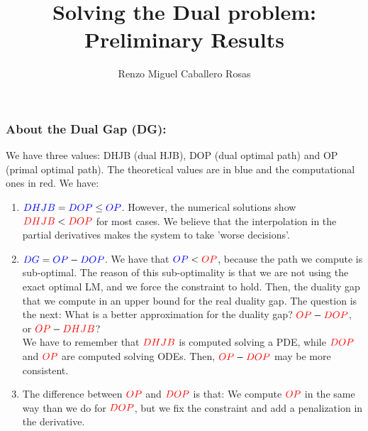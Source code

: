 \documentclass[aspectratio=169]{beamer}\usepackage[utf8]{inputenc}
\title{Solving the Dual problem:\\
Preliminary Results}
\subtitle{Renzo Miguel Caballero Rosas}
\begin{document}
\begin{frame}
\titlepage
\end{frame}

\graphicspath{{../../wsJobs/ws_lambdas_20191113/TEST_Matlab-Python/Optimization_OC_Subgradient_Method_Automatic/Simulations/}}

\begin{frame}\frametitle{About the Dual Gap (DG):}

We have three values: DHJB (dual HJB), DOP (dual optimal path) and OP (primal optimal path). The {\color{blue}theoretical values are in blue} and the {\color{red}computational ones in red}. We have:
\begin{enumerate}

\item ${\color{blue}DHJB} = {\color{blue}DOP}\leq{\color{blue}OP}$. However, the numerical solutions show ${\color{red}DHJB}<{\color{red}DOP}$ for most cases. We believe that the interpolation in the partial derivatives makes the system to take 'worse decisions'.

\item ${\color{blue}DG}={\color{blue}OP}-{\color{blue}DOP}$. We have that ${\color{blue}OP}<{\color{red}OP}$, because the path we compute is sub-optimal. The reason of this sub-optimality is that we are not using the exact optimal LM, and we force the constraint to hold. Then, the duality gap that we compute in an upper bound for the real duality gap. The question is the next: What is a better approximation for the duality gap? ${\color{red}OP}-{\color{red}DOP}$, or ${\color{red}OP}-{\color{red}DHJB}$?\\
We have to remember that ${\color{red}DHJB}$ is computed solving a PDE, while ${\color{red}DOP}$ and ${\color{red}OP}$ are computed solving ODEs. Then, ${\color{red}OP}-{\color{red}DOP}$ may be more consistent.

\item The difference between ${\color{red}OP}$ and ${\color{red}DOP}$ is that: We compute ${\color{red}OP}$ in the same way than we do for ${\color{red}DOP}$, but we fix the constraint and add a penalization in the derivative.

\end{enumerate}

\end{frame}
\end{document}
